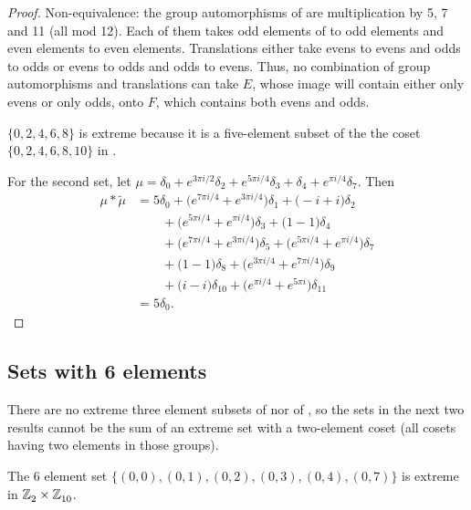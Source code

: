 \begin{proof} 
Non-equivalence: 
the group automorphisms of  are multiplication by 5, 7 and 11 (all mod 12). Each of them takes odd elements of  to odd elements and even elements to even elements. Translations either take evens to evens and odds to odds or evens to odds and odds to evens. Thus, no combination of group automorphisms and translations can take 
$E$, whose image will contain either only evens or only odds, onto $F$, which contains both evens and odds.

$\{0,2,4,6,8\}$ is extreme because it is a five-element subset of the the coset  $\{0,2,4,6,8,10\}$ in .

For the second set, let $\mu =
  \delta_{0}  +   e^{ 3\pi i  / 2}\delta_{2}  +   e^{ 5\pi i  / 4}\delta_{3}  +  \delta_{4}  +   e^{\pi i / 4}\delta_{7}
.$
  Then
\begin{align*} \mu * \tilde\mu&=   5\delta_{0}   +  \big( e^{ 7 \pi i / 4}+ e^{ 3 \pi i / 4}\big)\delta_{1}
  +  \big( -i +  i \big)\delta_{2} 
\\& \qquad
 +  \big( e^{ 5 \pi i / 4}+ e^{\pi i / 4}\big)\delta_{3} 
  +  \big(1-1\big)\delta_{4} 
\\& \qquad +  \big( e^{ 7 \pi i / 4}+ e^{ 3 \pi i / 4}\big)\delta_{5} 
  +  \big( e^{ 5 \pi i / 4}+ e^{\pi i / 4}\big)\delta_{7} 
\\& \qquad +  \big(1-1\big)\delta_{8} 
  +  \big( e^{ 3 \pi i / 4}+ e^{ 7 \pi i / 4}\big)\delta_{9} 
\\& \qquad +  \big(  i - i\big)\delta_{10} 
  +  \big( e^{\pi i / 4}+ e^{ 5 \pi i}\big)\delta_{11} 
  \\&= 5\delta_0.
\end{align*}
\end{proof}

\subsection{Sets with 6 elements}

There are no  extreme three element subsets of  nor of , so the sets in the next two results
cannot be the sum of an extreme set with a two-element coset (all cosets having two elements in those groups).


The 6 element set $\{(0, 0),  (0, 1),  (0, 2),  (0, 3),  (0, 4),  (0, 7) \}$ is extreme in $\texttt{$\mathbb Z_{2}^{\,}$} \times \texttt{$\mathbb Z_{10}^{\,}$}$. \newline 
 
